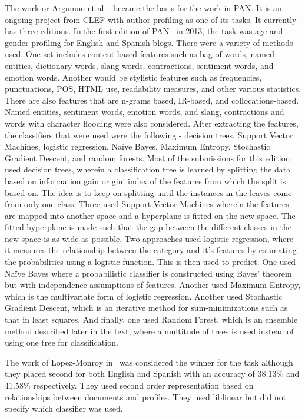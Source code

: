 \documentclass[a4paper]{llncs}
\begin{document}
The work or Argamon et al.~\cite{argamon2009automatically} became the basis for the work in PAN. It is an ongoing project from CLEF with author profiling as one of its tasks. It currently has three editions. In the first edition of PAN~\cite{rangel2013overview} in 2013, the task  was age and gender profiling for English and Spanish blogs. There were a variety of methods used. One set includes content-based features such as bag of words, named entities, dictionary words, slang words, contractions, sentiment words, and emotion words. Another would be stylistic features such as frequencies, punctuations, POS, HTML use, readability measures, and other various statistics. There are also features that are n-grams based, IR-based, and collocations-based. Named entities, sentiment words, emotion words, and slang, contractions and words with character flooding were also considered. After extracting the features, the classifiers that were used were the following - decision trees, Support Vector Machines, logistic regression, Naïve Bayes, Maximum Entropy, Stochastic Gradient Descent, and random forests. Most of the submissions for this edition used decision trees, wherein a classification tree is learned by splitting the data based on information gain or gini index of the features from which the split is based on. The idea is to keep on splitting until the  instances in the leaves come from only one class. Three used Support Vector Machines wherein the features are mapped into another space and a hyperplane is fitted on the new space. The fitted hyperplane is made such that the gap between the different classes in the new space is as wide as possible. Two approaches used logistic regression, where it measures the relationship between the category and it's features by estimating the probabilities using a logistic function. This is then used to predict. One used Naïve Bayes where a probabilistic classifier is constructed using Bayes' theorem but with independence assumptions of features. Another used Maximum Entropy, which is the multivariate form of logistic regression. Another used Stochastic Gradient Descent, which is an iterative method for sum-minimizations such as that in least squares. And finally, one used Random Forest, which is an ensemble method described later in the text, where a multitude of trees is used instead of using one tree for classification. 


The work of Lopez-Monroy in~\cite{lopez2013inaoe} was considered the winner for the task although they placed second for both English and Spanish with an accuracy of 38.13\% and 41.58\% respectively. They used second order representation based on relationships between documents and profiles. They used liblinear but did not specify which classifier was used.  
\end{document}
